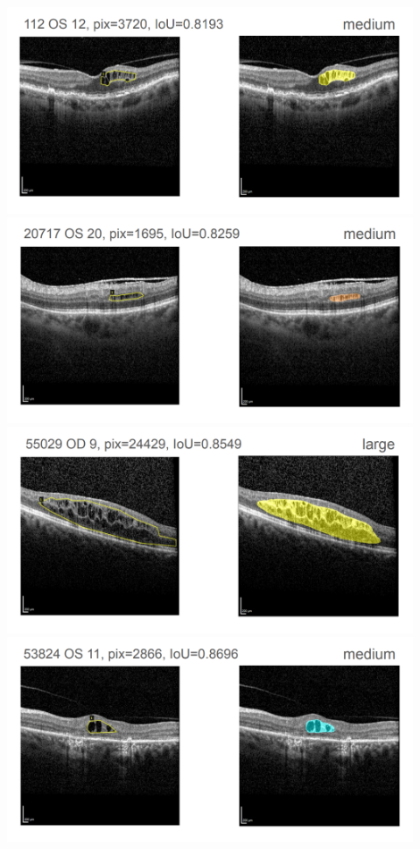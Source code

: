 \includegraphics[width=0.9\textwidth]{./pic/Segmentierung/Segmentierungsergebnisse/37.PNG}
\includegraphics[width=0.9\textwidth]{./pic/Segmentierung/Segmentierungsergebnisse/38.PNG}
\includegraphics[width=0.9\textwidth]{./pic/Segmentierung/Segmentierungsergebnisse/39.PNG}
\includegraphics[width=0.9\textwidth]{./pic/Segmentierung/Segmentierungsergebnisse/40.PNG}
